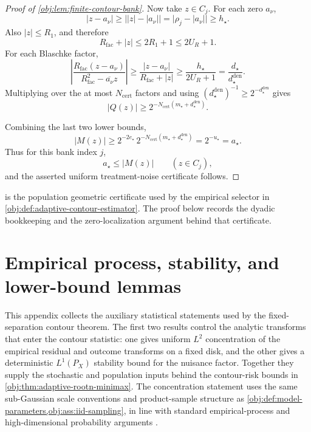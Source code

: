 \documentclass[11pt]{article}
\begin{document}
\begin{proof}[Proof of \cref{obj:lem:finite-contour-bank}]
Now take \(z\in C_j\).  For each zero \(a_\nu\),
\[
|z-a_\nu|
\ge \bigl||z|-|a_\nu|\bigr|
=\bigl|\rho_j-|a_\nu|\bigr|
\ge h_\star.
\]
Also \(|z|\le R_1\), and therefore
\[
R_{\mathrm{fac}}+|z|\le 2R_1+1\le 2U_R+1.
\]
For each Blaschke factor,
\[
\left|
\frac{R_{\mathrm{fac}}(z-a_\nu)}
     {R_{\mathrm{fac}}^2-\overline{a_\nu}z}
\right|
\ge
\frac{|z-a_\nu|}{R_{\mathrm{fac}}+|z|}
\ge
\frac{h_\star}{2U_R+1}
=
\frac{d_\star}{d_\star^{\mathrm{den}}}.
\]
Multiplying over the at most \(N_{\mathrm{cert}}\) factors and using
\((d_\star^{\mathrm{den}})^{-1}\ge2^{-d_\star^{\mathrm{den}}}\) gives
\[
|Q(z)|
\ge
2^{-N_{\mathrm{cert}}(m_\star+d_\star^{\mathrm{den}})}.
\]

Combining the last two lower bounds,
\[
|M(z)|
\ge
2^{-2e_\star}\,
2^{-N_{\mathrm{cert}}(m_\star+d_\star^{\mathrm{den}})}
=
2^{-u_\star}
=a_\star.
\]
Thus for this bank index \(j\),
\[
a_\star\le |M(z)|\qquad (z\in C_j),
\]
and the asserted uniform treatment-noise certificate follows. %
\end{proof}

 is the population geometric certificate used by the empirical selector in \cref{obj:def:adaptive-contour-estimator}. The proof below records the dyadic bookkeeping and the zero-localization argument behind that certificate.


\section{Empirical process, stability, and lower-bound lemmas}

This appendix collects the auxiliary statistical statements used by the fixed-separation contour theorem. The first two results control the analytic transforms that enter the contour statistic: one gives uniform \(L^2\) concentration of the empirical residual and outcome transforms on a fixed disk, and the other gives a deterministic \(L^1(P_X)\) stability bound for the nuisance factor. Together they supply the stochastic and population inputs behind the contour-risk bounds in \cref{obj:thm:adaptive-rootn-minimax}. The concentration statement uses the same sub-Gaussian scale conventions and product-sample structure as \cref{obj:def:model-parameters,obj:ass:iid-sampling}, in line with standard empirical-process and high-dimensional probability arguments \citep{VanDerVaart1998,VanDerVaartWellner1996,Vershynin2018,Wainwright2019}.
\end{document}
